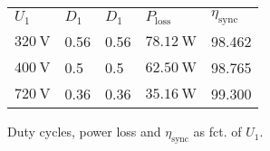 
\begin{solutiontable}[ht]
    \centering  %
    \begin{tabular}{lllll}
        \toprule
        
        $U_\mathrm{1}$ & $D_1$   &  $D_1$ & $P_\mathrm{loss}$      & $\eta_\mathrm{sync}$ \\ 
        $\SI{320}{\volt}$ & 0.56 &  0.56  & $\SI{78.12}{\watt}$ & 98.462 \\ 
        $\SI{400}{\volt}$ & 0.5  &  0.5   & $\SI{62.50}{\watt}$ & 98.765 \\ 
        $\SI{720}{\volt}$ & 0.36 &  0.36  & $\SI{35.16}{\watt}$ & 99.300 \\ 
        \bottomrule
    \end{tabular}
    \caption{Duty cycles, power loss and $\eta_\mathrm{sync}$ as fct. of $U_\mathrm{1}$.}
    \label{table:PowerlossDutyCycleEfficiencySync}
\end{solutiontable}
